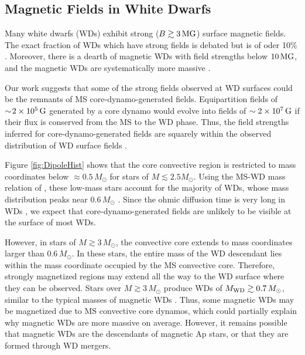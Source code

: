 

\subsection{Magnetic Fields in White Dwarfs}

Many white dwarfs (WDs) exhibit strong ($B \gtrsim 3 \, {\rm MG}$) surface magnetic fields. The exact fraction of WDs which have strong fields is debated but is of oder 10\% \citep{Hollands_2015}. Moreover, there is a dearth of magnetic WDs with field strengths below $10 \, {\rm MG}$, and the magnetic WDs are systematically more massive \citep{Ferrario_2015B}.

Our work suggests that some of the strong fields observed at WD surfaces could be the remnants of MS core-dynamo-generated fields. Equipartition fields of $\sim \! 2 \times 10^5 \, {\rm G}$ generated by a core dynamo would evolve into fields of $\sim 2 \times 10^7 \, {\rm G}$ if their flux is conserved from the MS to the WD phase. Thus, the field strengths inferred for core-dynamo-generated fields are squarely within the observed distribution of WD surface fields \citep{Ferrario_2015A,Ferrario_2015B}.

Figure \ref{fig:DipoleHist} shows that the core convective region is restricted to mass coordinates below $\approx 0.5 \, M_\odot$ for stars of $M \lesssim 2.5 M_\odot$. Using the MS-WD mass relation of \cite{Renedo_2010}, these low-mass stars account for the majority of WDs, whose mass distribution peaks near $0.6 \, M_\odot$ \citep{Rebassa-Mansergas_2015}. Since the ohmic diffusion time is very long in WDs \citep{Ferrario_2015B}, we expect that core-dynamo-generated fields are unlikely to be visible at the surface of most WDs. 

However, in stars of $M \gtrsim 3 \, M_\odot$, the convective core extends to mass coordinates larger than $0.6 \, M_\odot$.  In these stars, the entire mass of the WD descendant lies within the mass coordinate occupied by the MS convective core. Therefore, strongly magnetized regions may extend all the way to the WD surface where they can be observed. Stars over $M \gtrsim 3 \, M_\odot$ produce WDs of $M_{\rm WD} \gtrsim 0.7 \, M_\odot$, similar to the typical masses of magnetic WDs \citep{Ferrario_2015B}. Thus, some magnetic WDs may be magnetized due to MS convective core dynamos, which could partially explain why magnetic WDs are more massive on average. However, it remains possible that magnetic WDs are the descendants of magnetic Ap stars, or that they are formed through WD mergers. 

